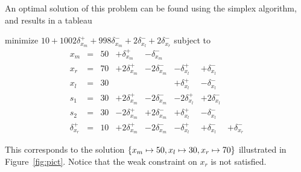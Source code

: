 \documentclass{uist96}
\newcommand{\ignore}[1]{}
\begin{document}
An optimal solution of this problem can be found using the simplex algorithm,
and results in a tableau
\begin{trivlist}\item
minimize $10 + 1002 \delta_{x_m}^+ + 998 \delta_{x_m}^-  + 2
\delta_{x_l}^- + 2\delta_{x_r}^- $ 
subject to 
$$
\begin{array}{rlrrrrrr} 
x_m & = &50 &  + \delta_{x_m}^+ & - \delta_{x_m}^- \\
x_r & = &70 & + 2 \delta_{x_m}^+ & - 2\delta_{x_m}^- &
		- \delta_{x_l}^+ & + \delta_{x_l}^- \\ \hline
x_l & = & 30  & & & + \delta_{x_l}^+ & - \delta_{x_l}^- \\
s_1 & = &30 &  + 2 \delta_{x_m}^+ & - 2\delta_{x_m}^- &
		-2 \delta_{x_l}^+ & +2 \delta_{x_l}^- \\
s_2 & = &30 &   - 2 \delta_{x_m}^+ &+2\delta_{x_m}^- &
		+ \delta_{x_l}^+ & - \delta_{x_l}^- \\
\delta_{x_r}^+ & = & 10 & + 2 \delta_{x_m}^+  & - 2\delta_{x_m}^- &
	- \delta_{x_l}^+ & + \delta_{x_l}^- & +\delta_{x_r}^-
\end{array}
$$
\end{trivlist}
This corresponds to the solution
$\{x_m \mapsto 50, x_l \mapsto 30, \linebreak x_r \mapsto 70\}$ 
illustrated in Figure~\ref{fig:pict}.
Notice that the weak constraint on $x_r$ is not satisfied.

\ignore{ %
The form of the problem is a conjunction of required
inequalities $C$
all of whose variables are constrained to be non-negative
and together with a set of strong edit constraints on 
variables $E$
and a set of weak stay constraints on variables $S$\@.

\textbf{already here}
The handling of the non-required constraints is as follows:
Suppose $x = \alpha$ is a edit or stay constraint.
We introduce two 
error variables $\delta_x^+$ and $\delta_x^-$ that 
are respectively the amount $x$ is  above $\alpha$
or zero if it is equal or below $\alpha$, and 
analogously the amount $x$ is below $\alpha$.
A new equation constraint is introduced: 
$x = \alpha + \delta_x^+ - \delta_x^-$\@.
Because this is the only constraint that involves variables
$\delta_x^+$ and $\delta_x^-$ they will always in any equation in the tableau 
be present with coefficients
$a^+$ and $a^-$ such that $a^+ = -a^-$.


The optimization function includes a term 
$f(strength) * \delta_x^+ + f(strength) * \delta_x^-$
where $f$ is a function that maps 
a strength $strength$
to a real multiple, so that the stronger constraints
are of more importance than the weaker ones.
} %
\end{document}

